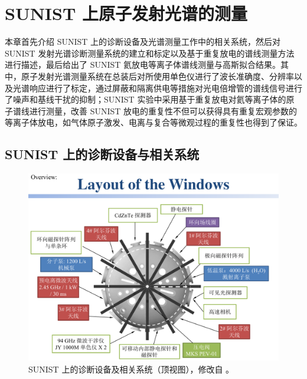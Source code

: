 \graphicspath{{figures/chap04/}}

\chapter{SUNIST 上原子发射光谱的测量}
\label{chap:measureing-system}


本章首先介绍 SUNIST 上的诊断设备及光谱测量工作中的相关系统，然后对 SUNIST 发射光谱诊断测量系统的建立和标定以及基于重复放电的谱线测量方法进行描述，最后给出了 SUNIST 氦放电等离子体谱线测量与高斯拟合结果。其中，原子发射光谱测量系统在总装后对所使用单色仪进行了波长准确度、分辨率以及光谱响应进行了标定，通过屏蔽和隔离供电等措施对光电倍增管的谱线信号进行了噪声和基线干扰的抑制；SUNIST 实验中采用基于重复放电对氦等离子体的原子谱线进行测量，改善 SUNIST 放电的重复性不但可以获得具有重复宏观参数的等离子体放电，如气体原子激发、电离与复合等微观过程的重复性也得到了保证。

\section{SUNIST 上的诊断设备与相关系统}

\begin{figure}[H]
  \centering
  \includegraphics[width=\textwidth]{AvailableDiagnosticsOfSUNIST-14.pdf}
  \caption{SUNIST 上的诊断设备及相关系统（顶视图），修改自 。}
  \label{fig:chap04:AvailableDiagnosticsOfSUNIST}
\end{figure}

